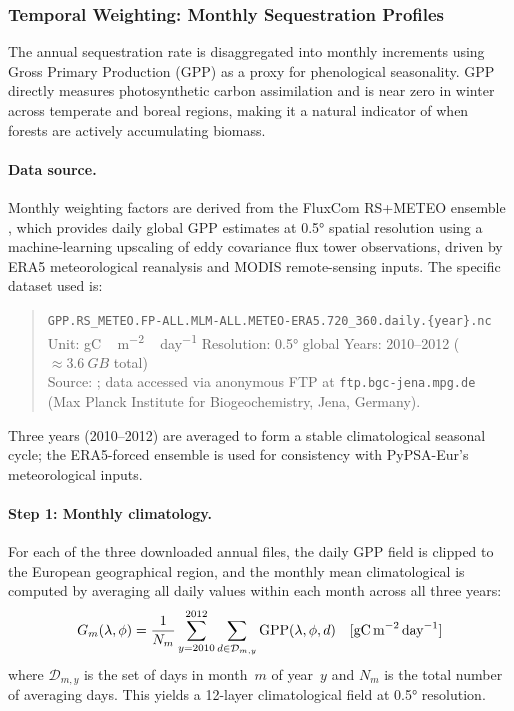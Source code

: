 \documentclass[12pt, a4paper]{article}
\begin{document}
\subsubsection{Temporal Weighting: Monthly Sequestration Profiles}
\label{sec:affo_temporal}

The annual sequestration rate is disaggregated into monthly increments using
Gross Primary Production (GPP) as a proxy for phenological seasonality.
GPP directly measures photosynthetic carbon assimilation and is near zero in
winter across temperate and boreal regions, making it a natural indicator of
when forests are actively accumulating biomass.

\paragraph{Data source.}
Monthly weighting factors are derived from the FluxCom RS+METEO ensemble
\citep{Jung2020}, which provides daily global GPP estimates at \ang{0.5}
spatial resolution using a machine-learning upscaling of eddy covariance flux
tower observations, driven by ERA5 meteorological reanalysis and MODIS
remote-sensing inputs. The specific dataset used is:

\begin{quote}
\small
{\footnotesize\texttt{GPP.RS\_METEO.FP-ALL.MLM-ALL.METEO-ERA5.720\_360.daily.\{year\}.nc}}\\[2pt]
Unit: \si{gC\,m^{-2}\,day^{-1}} \quad
Resolution: \ang{0.5} global \quad
Years: 2010--2012 (${\approx}\SI{3.6}{GB}$ total)\\
Source: \citet{Jung2020}; data accessed via anonymous FTP at
\texttt{ftp.bgc\allowbreak-jena.mpg.de} (Max Planck Institute for Biogeochemistry,
Jena, Germany).
\end{quote}

Three years (2010--2012) are averaged to form a stable climatological seasonal
cycle; the ERA5-forced ensemble is used for consistency with PyPSA-Eur's
meteorological inputs.


\paragraph{Step 1: Monthly climatology.}
For each of the three downloaded annual files, the daily GPP field is clipped
to the European geographical region, and the monthly mean climatological is  computed by averaging all daily values
within each month across all three years:
\begin{equation}
    G_m(\lambda, \phi)
    = \frac{1}{N_m} \sum_{y=2010}^{2012} \sum_{d \in \mathcal{D}_{m,y}}
      \text{GPP}(\lambda, \phi, d)
    \quad [\text{gC\,m}^{-2}\,\text{day}^{-1}]
    \label{eq:gpp_climatology}
\end{equation}
where $\mathcal{D}_{m,y}$ is the set of days in month~$m$ of year~$y$ and
$N_m$ is the total number of averaging days. This yields a 12-layer
climatological field at \ang{0.5} resolution.
\end{document}
